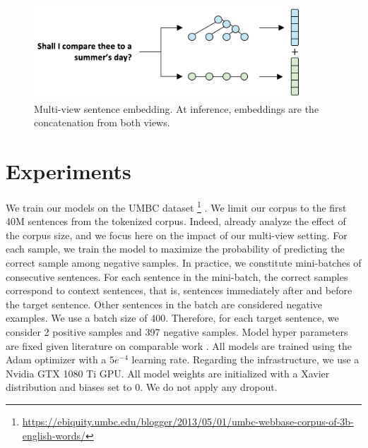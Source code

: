 \begin{figure}[!htb]
\begin{center}
\includegraphics[width=10cm]{images/contrastive-inf.png}
\end{center}
\caption{Multi-view sentence embedding. At inference, embeddings are the concatenation from both views.}
\end{figure}

\section{Experiments}

We train our models on the UMBC dataset \footnote{\url{https://ebiquity.umbc.edu/blogger/2013/05/01/umbc-webbase-corpus-of-3b-english-words/}} \parencite{han_13}. We limit our corpus to the first 40M sentences from the tokenized corpus. Indeed, \textcite{logeswaran_18} already analyze the effect of the corpus size, and we focus here on the impact of our multi-view setting. For each sample, we train the model to maximize the probability of predicting the correct sample among negative samples. In practice, we constitute mini-batches of consecutive sentences. For each sentence in the mini-batch, the correct samples correspond to context sentences, that is, sentences immediately after and before the target sentence. Other sentences in the batch are considered negative examples. We use a batch size of 400. Therefore, for each target sentence, we consider 2 positive samples and 397 negative samples. Model hyper parameters are fixed given literature on comparable work \parencite{tai_15, logeswaran_18}. All models are trained using the Adam optimizer with a $5e^{-4}$ learning rate. Regarding the infrastructure, we use a Nvidia GTX 1080 Ti GPU. All model weights are initialized with a Xavier distribution and biases set to 0. We do not apply any dropout. 

